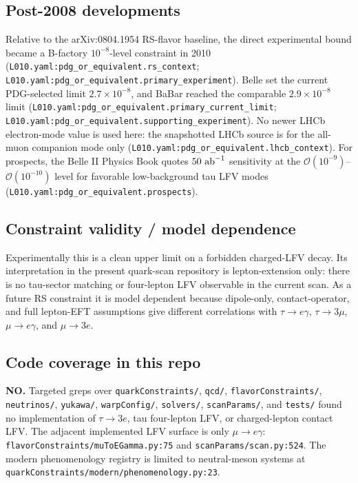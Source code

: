 \subsection*{Post-2008 developments}
Relative to the arXiv:0804.1954 RS-flavor baseline, the direct experimental
bound became a B-factory \(10^{-8}\)-level constraint in 2010
(\texttt{L010.yaml:pdg\_or\_equivalent.rs\_context};
\texttt{L010.yaml:pdg\_or\_equivalent.primary\_experiment}).  Belle set the
current PDG-selected limit \(2.7\times10^{-8}\), and BaBar reached the
comparable \(2.9\times10^{-8}\) limit
(\texttt{L010.yaml:pdg\_or\_equivalent.primary\_current\_limit};
\texttt{L010.yaml:pdg\_or\_equivalent.supporting\_experiment}).  No newer LHCb
electron-mode value is used here: the snapshotted LHCb source is for the
all-muon companion mode only
(\texttt{L010.yaml:pdg\_or\_equivalent.lhcb\_context}).  For prospects, the
Belle II Physics Book quotes \(50~{\rm ab}^{-1}\) sensitivity at the
\(\mathcal{O}(10^{-9})\)--\(\mathcal{O}(10^{-10})\) level for favorable
low-background tau LFV modes
(\texttt{L010.yaml:pdg\_or\_equivalent.prospects}).

\subsection*{Constraint validity / model dependence}
Experimentally this is a clean upper limit on a forbidden charged-LFV decay.
Its interpretation in the present quark-scan repository is lepton-extension
only: there is no tau-sector matching or four-lepton LFV observable in the
current scan.  As a future RS constraint it is model dependent because
dipole-only, contact-operator, and full lepton-EFT assumptions give different
correlations with \(\tau\to e\gamma\), \(\tau\to 3\mu\), \(\mu\to e\gamma\),
and \(\mu\to 3e\).

\subsection*{Code coverage in this repo}
\textbf{NO.}  Targeted greps over \texttt{quarkConstraints/},
\texttt{qcd/}, \texttt{flavorConstraints/}, \texttt{neutrinos/},
\texttt{yukawa/}, \texttt{warpConfig/}, \texttt{solvers/},
\texttt{scanParams/}, and \texttt{tests/} found no implementation of
\(\tau\to3e\), tau four-lepton LFV, or charged-lepton contact LFV.  The
adjacent implemented LFV surface is only \(\mu\to e\gamma\):
\texttt{flavorConstraints/muToEGamma.py:75} and
\texttt{scanParams/scan.py:524}.  The modern phenomenology registry is limited
to neutral-meson systems at \texttt{quarkConstraints/modern/phenomenology.py:23}.

